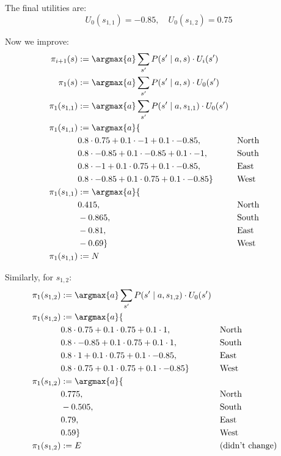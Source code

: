 The final utilities are:
\begin{equation*}
    U_0(s_{1,1}) = -0.85, \quad U_0(s_{1,2}) = 0.75
\end{equation*}

Now we improve:
\begin{align*}
\pi_{i+1}(s) &:= \argmax{a} \sum_{s'} P(s' \mid a,s) \cdot U_i(s') \\
\pi_{1}(s) &:= \argmax{a} \sum_{s'} P(s' \mid a,s) \cdot U_0(s') \\
\pi_{1}(s_{1,1}) &:= \argmax{a} \sum_{s'} P(s' \mid a,s_{1,1}) \cdot U_0(s') \\
\pi_{1}(s_{1,1}) &:= \argmax{a} \{ \\
&0.8 \cdot 0.75 + 0.1 \cdot -1 + 0.1 \cdot -0.85 , && \text{North} \\
&0.8 \cdot -0.85 + 0.1 \cdot -0.85 + 0.1 \cdot -1 ,  && \text{South} \\
&0.8 \cdot -1 + 0.1 \cdot 0.75 + 0.1 \cdot -0.85 ,  && \text{East} \\
&0.8 \cdot -0.85 + 0.1 \cdot 0.75 + 0.1 \cdot -0.85 \} && \text{West} \\
\pi_{1}(s_{1,1}) &:= \argmax{a} \{ \\
&0.415 , && \text{North} \\
&-0.865 ,  && \text{South} \\
&-0.81 ,  && \text{East} \\
&-0.69 \} && \text{West} \\
\pi_{1}(s_{1,1}) &:= N
\end{align*}

Similarly, for $s_{1,2}$:
\begin{align*}
\pi_{1}(s_{1,2}) &:= \argmax{a} \sum_{s'} P(s' \mid a,s_{1,2}) \cdot U_0(s') \\
\pi_{1}(s_{1,2}) &:= \argmax{a} \{ \\
&0.8 \cdot 0.75 + 0.1 \cdot 0.75 + 0.1 \cdot 1 , && \text{North} \\
&0.8 \cdot -0.85 + 0.1 \cdot 0.75 + 0.1 \cdot 1 ,  && \text{South} \\
&0.8 \cdot 1 + 0.1 \cdot 0.75 + 0.1 \cdot -0.85 ,  && \text{East} \\
&0.8 \cdot 0.75 + 0.1 \cdot 0.75 + 0.1 \cdot -0.85 \} && \text{West} \\
\pi_{1}(s_{1,2}) &:= \argmax{a} \{ \\
&0.775 , && \text{North} \\
&-0.505 ,  && \text{South} \\
&0.79 ,  && \text{East} \\
&0.59 \} && \text{West} \\
\pi_{1}(s_{1,2}) &:= E && (\text{didn't change})
\end{align*}

